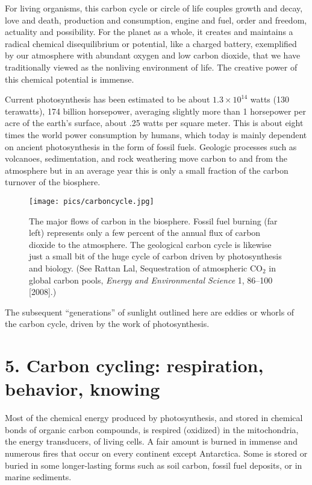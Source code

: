\documentclass[11pt,letterpaper,twoside,onecolumn]{memoir}
\begin{document}
For living organisms, this carbon cycle or circle of life couples growth and decay, love and death, production and consumption, engine and fuel, order and freedom, actuality and possibility. For the planet as a whole, it creates and maintains a radical chemical disequilibrium or potential, like a charged battery, exemplified by our atmosphere with abundant oxygen and low carbon dioxide, that we have traditionally viewed as the nonliving environment of life. The creative power of this chemical potential is immense.

Current photosynthesis has been estimated to be about $1.3 \times 10^{14}$ watts (130 terawatts), 174 billion horsepower, averaging slightly more than 1 horsepower per acre of the earth's surface, about .25 watts per square meter. This is about eight times the world power consumption by humans, which today is mainly dependent on ancient photosynthesis in the form of fossil fuels. Geologic processes such as volcanoes, sedimentation, and rock weathering move carbon to and from the atmosphere but in an average year this is only a small fraction of the carbon turnover of the biosphere.

\begin{figure}
\texttt{[image: pics/carboncycle.jpg]}
\caption*{The major flows of carbon in the biosphere. Fossil fuel burning (far left) represents only a few percent of the annual flux of carbon dioxide to the atmosphere. The geological carbon cycle is likewise just a small bit of the huge cycle of carbon driven by photosynthesis and biology. (See Rattan Lal, Sequestration of atmospheric CO$_{2}$ in global carbon pools, \textit{Energy and Environmental Science} 1, 86--100 [2008].)}
\end{figure}

The subsequent ``generations'' of sunlight outlined here are eddies or whorls of the carbon cycle, driven by the work of photosynthesis. 

\section*{5. Carbon cycling: respiration, behavior, knowing}

Most of the chemical energy produced by photosynthesis, and stored in chemical bonds of organic carbon compounds, is respired (oxidized) in the mitochondria, the energy transducers, of living cells. A fair amount is burned in immense and numerous fires that occur on every continent except Antarctica. Some is stored or buried in some longer-lasting forms such as soil carbon, fossil fuel deposits, or in marine sediments.
\end{document}
